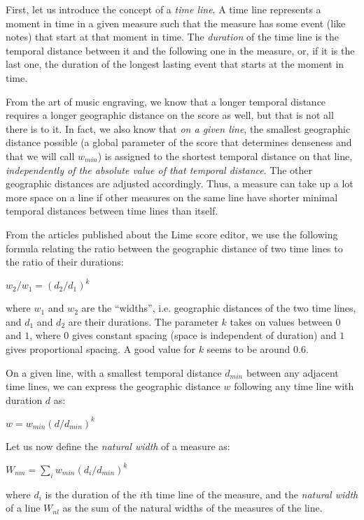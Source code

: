 First, let us introduce the concept of a \emph{time line}. A time line represents a moment in time in a given measure such
that the measure has some event (like notes) that start at that moment
in time.  The \emph{duration} of the
time line is the temporal distance between it and the following one in
the measure, or, if it is the last one, the duration of the longest
lasting event that starts at the moment in time. 

From the art of music engraving, we know that a longer temporal
distance requires a longer geographic distance on the score as well,
but that is not all there is to it.  In fact, we also know that
\emph{on a given line}, the smallest geographic distance possible (a
global parameter of the score that determines denseness and that we
will call $w_{min}$) is assigned to the shortest temporal distance on
that line, \emph{independently of the absolute value of that temporal
distance}. The other geographic distances are adjusted accordingly.
Thus, a measure can take up a lot more space on a line if other
measures on the same line have shorter minimal temporal distances
between time lines than itself.

From the articles published about the Lime score editor, we use the
following formula relating the ratio between the geographic distance
of two time lines to the ratio of their durations:

$w_2 / w_1 = {(d_2 / d_1)}^k$

where $w_1$ and $w_2$ are the ``widths'', i.e. geographic distances of
the two time lines, and $d_1$ and $d_2$ are their durations. The
parameter $k$ takes on values between $0$ and $1$, where $0$ gives
constant spacing (space is independent of duration) and $1$ gives
proportional spacing.  A good value for $k$ seems to be around $0.6$. 

On a given line, with a smallest temporal distance $d_{min}$ between
any adjacent time lines, we can express the geographic distance
$w$ following any time line with duration $d$ as:

$w = w_{min} {(d / d_{min})}^k$

Let us now define the \emph{natural width} of a measure as:

$W_{nm} = \sum_i w_{min} {(d_i / d_{min})}^k$

where $d_i$ is the duration of the $i$th time line of the measure, and
the \emph{natural width} of a line $W_{nl}$ as the sum of the natural
widths of the measures of the line.  

